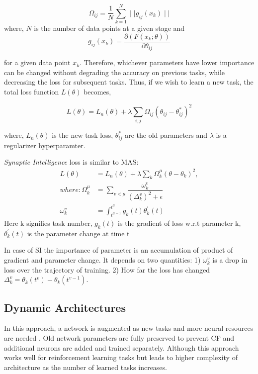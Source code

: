 \documentclass[11pt,a4paper]{article}
\begin{document}
\begin{equation}
\Omega_{ij} =\frac{1}{N}\sum_{k=1}^N  \mid\mid g_{ij}(x_k) \mid\mid
\end{equation}
where, $N$ is the number of data points at a given stage and
\begin{equation}
g_{ij}(x_k)=\frac{\partial (F(x_k; \theta))}{\partial \theta_{ij}}
\end{equation}

for a given data point $x_k$. Therefore, whichever parameters have lower importance can be changed without degrading the accuracy on previous tasks, while decreasing the loss for subsequent tasks. Thus, if we wish to learn a new task, the total loss function $L(\theta)$ becomes,

\begin{equation}
L(\theta)=L_n(\theta)+{\lambda} \sum_{i,j} \Omega_{ij}(\theta_{ij}-\theta^*_{ij})^2
\end{equation}

where, $L_n(\theta)$ is the new task loss, $\theta^*_{ij}$ are the old parameters and $\lambda$ is a regularizer hyperparamter.


 \citet{DBLP:journals/corr/ZenkePG17} \textit{Synaptic Intelligence} loss is similar to MAS: 
 \begin{align*}
     L(\theta) &=L_n(\theta)+{\lambda} \sum_{k} \Omega_k^{\mu} (\theta - \theta_k)^2,\\ 
     where:
     \Omega_k^{\mu} &= \sum_{v<\mu} \dfrac{\omega_k^v}{(\Delta_k^v)^2+\epsilon} \\
     \omega_k^v &= \int_{t^{\mu-1}}^{t^{\mu}} g_k(t)\theta^{'}_k(t)
 \end{align*}
Here k signifies task number, $g_k(t)$ is the gradient of loss w.r.t parameter k, $\theta^{'}_k(t)$ is the parameter change at time t

In case of SI the importance of parameter is an accumulation of product of gradient and parameter change. It depends on two quantities: 1) $ \omega_k^v $ is a drop in loss over the trajectory of training. 2) How far the loss has changed $\Delta_k^v = \theta_k(t^v) - \theta_k(t^{v-1})$.


\subsection{Dynamic Architectures} 
In this approach, a network is augmented as new tasks and more neural resources are needed \cite{Rusu2016ProgressiveNN, Cortes2017AdaNetAS}. Old network parameters are fully preserved to prevent CF and additional neurons are added and trained separately. Although this approach works well for reinforcement learning tasks but leads to higher complexity of architecture as the number of learned tasks increases.
\end{document}
